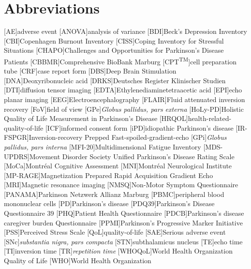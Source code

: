 \chapter*{Abbreviations}
\let\oldbaselinestretch=\baselinestretch%
\renewcommand{\baselinestretch}{1}%
\large\normalsize%
\thispagestyle{plain}
\begin{multicols}{2}
\begin{acronym}
\setlength{\parskip}{0ex}
[AE]{adverse event}
[ANOVA]{analysis of variance}
[BDI]{Beck's Depression Inventory}
[CBI]{Copenhagen Burnout Inventory}
[CISS]{Coping Inventory for Stressful Situations}
[CHAPO]{Challenges and Opportunities for Parkinson's Disease Patients}
[CBBMR]{Comprehensive BioBank Marburg}
[CPT\textsuperscript{TM}]{cell preparation tube}
[CRF]{case report form}
[DBS]{Deep Brain Stimulation}
[DNA]{Deoxyribonucleic acid}
[DRKS]{Deutsches Register Klinischer Studien}
[DTI]{diffusion tensor imaging}
[EDTA]{Ethylenediaminetetraacetic acid}
[EPI]{echo planar imaging}
[EEG]{Electroencephalography}
[FLAIR]{Fluid attenuated inversion recovery}
[FoV]{field of view}
[GPe]{\textit{Globus pallidus, pars externa}}
[HoLy-PD]{Holistic Quality of Life Measurement in Parkinson's Disease}
[HRQOL]{health-related-quality-of-life}
[ICF]{informed consent form}
[iPD]{idiopathic Parkinson's disease}
[IR-FSPGR]{Inversion-recovery Prepped Fast-spoiled-gradient-echo}
[GPi]{\textit{Globus pallidus, pars interna}}
[MFI-20]{Multidimensional Fatigue Inventory}
[MDS-UPDRS]{Movement Disorder Society Unified Parkinson's Disease Rating Scale}
[MoCa]{Montréal Cognitive Assessment}
[MNI]{Montréal Neurological Institute}
[MP-RAGE]{Magnetization Prepared Rapid Acquisition Gradient Echo}
[MRI]{Magnetic resonance imaging}
[NMSQ]{Non-Motor Symptom Questionnaire}
[PANAMA]{Parkinson Netzwerk Allianz Marburg}
[PBMC]{peripheral blood mononuclear cells}
[PD]{Parkinson's disease}
[PDQ39]{Parkinson's Disease Questionnaire 39}
[PHQ]{Patient Health Questionnaire}
[PDCB]{Parkinson’s disease caregiver burden Questionnaire}
[PPMI]{Parkinson's Progressive Marker Initiative}
[PSS]{Perceived Stress Scale}
[QoL]{quality-of-life}
[SAE]{Serious adverse event}
[SNc]{\textit{substantia nigra, pars compacta}}
[STN]{subthalamicus nucleus}
[TE]{echo time}
[TI]{inversion time}
[TR]{\textit{repetition time}}
[WHOQoL]{World Health Organization Quality of Life}
[WHO]{World Health Organization}
\end{acronym}
\renewcommand{\baselinestretch}{\oldbaselinestretch}%
\large\normalsize%
\end{multicols}
